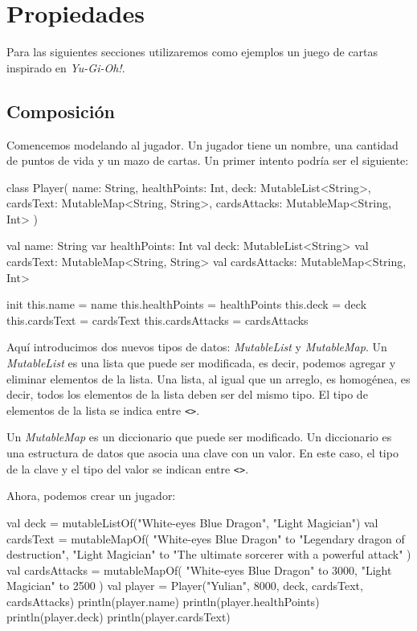\section{Propiedades}
  Para las siguientes secciones utilizaremos como ejemplos un juego de cartas inspirado en
  \textit{Yu-Gi-Oh!}.

  \subsection{Composición}
    Comencemos modelando al jugador.
    Un jugador tiene un nombre, una cantidad de puntos de vida y un mazo de cartas.
    Un primer intento podría ser el siguiente:

    \begin{kotlin}
      class Player(
        name: String,
        healthPoints: Int,
        deck: MutableList<String>,
        cardsText: MutableMap<String, String>,
        cardsAttacks: MutableMap<String, Int>
      ) {
        val name: String
        var healthPoints: Int
        val deck: MutableList<String>
        val cardsText: MutableMap<String, String>
        val cardsAttacks: MutableMap<String, Int>

        init {
          this.name = name
          this.healthPoints = healthPoints
          this.deck = deck
          this.cardsText = cardsText
          this.cardsAttacks = cardsAttacks
        }
      }
    \end{kotlin}

    Aquí introducimos dos nuevos tipos de datos: \textit{MutableList} y \textit{MutableMap}.
    Un \textit{MutableList} es una lista que puede ser modificada, es decir, podemos agregar y
    eliminar elementos de la lista.
    Una lista, al igual que un arreglo, es homogénea, es decir, todos los elementos de la lista
    deben ser del mismo tipo.
    El tipo de elementos de la lista se indica entre \texttt{<>}.

    Un \textit{MutableMap} es un diccionario que puede ser modificado.
    Un diccionario es una estructura de datos que asocia una clave con un valor.
    En este caso, el tipo de la clave y el tipo del valor se indican entre \texttt{<>}.

    Ahora, podemos crear un jugador:

    \begin{kotlin}
      val deck = mutableListOf("White-eyes Blue Dragon", "Light Magician")
      val cardsText = mutableMapOf(
        "White-eyes Blue Dragon" to "Legendary dragon of destruction",
        "Light Magician" to "The ultimate sorcerer with a powerful attack"
      )
      val cardsAttacks = mutableMapOf(
        "White-eyes Blue Dragon" to 3000,
        "Light Magician" to 2500
      )
      val player = Player("Yulian", 8000, deck, cardsText, cardsAttacks)
      println(player.name)
      println(player.healthPoints)
      println(player.deck)
      println(player.cardsText)
    \end{kotlin}

